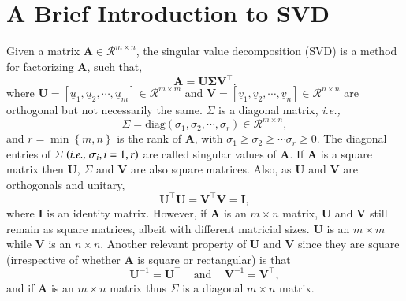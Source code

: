 \documentclass[preprint,12pt]{elsarticle}
\newcommand{\ie}{{\it i.e., }}
\begin{document}
\clearpage 

%
\clearpage  
\listoffigures
\clearpage
 

\clearpage
\appendix
\section{\\A Brief Introduction to SVD}\label{subsection:svd_brief}
Given a matrix $\mathbf{A}\in\mathcal{R}^{m\times n}$, the singular value decomposition (SVD) is a method for factorizing $\mathbf{A}$, such that,
\begin{equation}
  \mathbf{A} = \mathbf{U}\mathbf{\Sigma}\mathbf{V}^{\intercal}.
\end{equation}
where $\mathbf{U}=\left[\underline{u}_{1},\underline{u}_{2},\cdots,\underline{u}_{m}\right]\in\mathcal{R}^{m\times m}$ and $\mathbf{V}=\left[\underline{v}_{1},\underline{v}_{2},\cdots,\underline{v}_{n}\right]\in\mathcal{R}^{n\times n}$ are orthogonal but not necessarily the same. $\Sigma$ is a diagonal matrix, \ie
\begin{displaymath}
  \Sigma=\text{diag}\left(\sigma_{1},\sigma_{2},\cdots,\sigma_{r}\right)\in\mathcal{R}^{m\times n},
\end{displaymath}
and $r=\min\left\{m,n\right\}$ is the rank of $\mathbf{A}$, with $\sigma_{1}\ge\sigma_{2}\ge\cdots\sigma_{r}\ge 0$. The diagonal entries of $\Sigma$ $\left(\text{\ie} \sigma_{i}, i=1,r\right)$ are called singular values of $\mathbf{A}$. If $\mathbf{A}$ is a square matrix then $\mathbf{U}$, $\Sigma$ and $\mathbf{V}$ are also square matrices. Also, as $\mathbf{U}$ and $\mathbf{V}$ are orthogonals and unitary, 
\begin{equation}
  \mathbf{U}^{\intercal}\mathbf{U} = \mathbf{V}^{\intercal}\mathbf{V} = \mathbf{I},
\end{equation}
where $\mathbf{I}$ is an identity matrix. However, if $\mathbf{A}$ is an $m\times n$ matrix, $\mathbf{U}$ and $\mathbf{V}$ still remain as square matrices, albeit with different matricial sizes. $\mathbf{U}$ is an $m\times m$ while $\mathbf{V}$ is an $n\times n$. Another relevant property of $\mathbf{U}$ and $\mathbf{V}$ since they are square (irrespective of whether $\mathbf{A}$ is square or rectangular) is that
\begin{equation}
  \mathbf{U}^{-1} = \mathbf{U}^{\intercal} \;\;\;\text{ and }\;\;\; \mathbf{V}^{-1} = \mathbf{V}^{\intercal},
\end{equation}
and if $\mathbf{A}$ is an $m \times n$ matrix thus $\Sigma$ is a diagonal $m \times n$ matrix.
\end{document}
